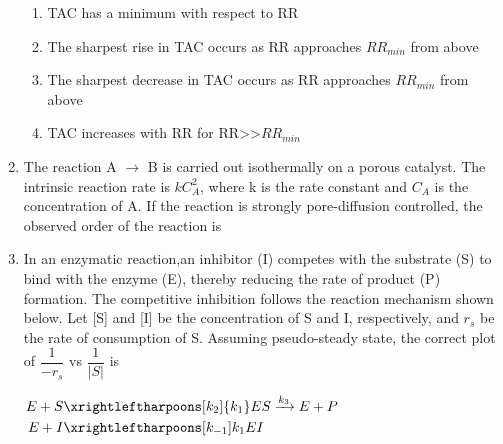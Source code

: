 \documentclass[journal]{IEEEtran}
\numberwithin{equation}{enumi}
\numberwithin{figure}{enumi}
\begin{document}
\begin{enumerate}[start=1, label={Q\arabic*.}]
\begin{enumerate} 
  \item TAC has a minimum with respect to RR
  \item The sharpest rise in TAC occurs as RR approaches $RR_{min}$ from above 
  \item The sharpest decrease in TAC occurs as RR approaches $RR_{min}$ from above
  \item TAC increases with RR for RR>>$RR_{min}$
  \end{enumerate}
\newpage
\item The reaction A $\rightarrow$ B is carried out isothermally on a porous catalyst. The intrinsic reaction rate is $kC^2_A$, where k is the rate constant and $C_A$ is the concentration of A. If the reaction is strongly pore-diffusion controlled, the observed order of the reaction is
\begin{enumerate} 
  \end{enumerate}
\item In an enzymatic reaction,an inhibitor (I) competes with the substrate (S) to bind with the enzyme (E), thereby reducing the rate of product (P) formation. The competitive inhibition follows the reaction mechanism shown below. Let [S] and [I] be the concentration of S and I, respectively, and $r_s$ be the rate of consumption of S. Assuming pseudo-steady state, the correct plot of $\dfrac{1}{-r_s}$ vs $\dfrac{1}{|S|}$ is

$
\begin{aligned}
E + S &\xrightleftharpoons[k_2]{k_1} ES \xrightarrow{k_3} E + P \\
E + I &\xrightleftharpoons[k_{-1}]{k_1} EI
\end{aligned}
$

\begin{enumerate}
\end{enumerate}
\end{enumerate}
\end{document}

